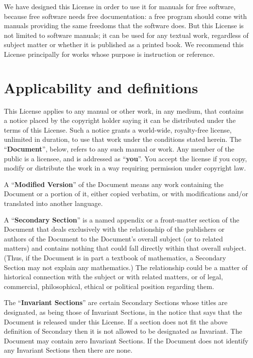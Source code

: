 \documentclass[a4paper,spanish,12pt]{book}
\begin{document}
We have designed this License in order to use it for manuals for free
software, because free software needs free documentation: a free
program should come with manuals providing the same freedoms that the
software does.  But this License is not limited to software manuals;
it can be used for any textual work, regardless of subject matter or
whether it is published as a printed book.  We recommend this License
principally for works whose purpose is instruction or reference.

\section{Applicability and definitions}

This License applies to any manual or other work, in any medium, that
contains a notice placed by the copyright holder saying it can be
distributed under the terms of this License.  Such a notice grants a
world-wide, royalty-free license, unlimited in duration, to use that
work under the conditions stated herein.  The ``\textbf{Document}'', below,
refers to any such manual or work.  Any member of the public is a
licensee, and is addressed as ``\textbf{you}''.  You accept the license if you
copy, modify or distribute the work in a way requiring permission
under copyright law.

A ``\textbf{Modified Version}'' of the Document means any work containing the
Document or a portion of it, either copied verbatim, or with
modifications and/or translated into another language.

A ``\textbf{Secondary Section}'' is a named appendix or a front-matter section of
the Document that deals exclusively with the relationship of the
publishers or authors of the Document to the Document's overall subject
(or to related matters) and contains nothing that could fall directly
within that overall subject.  (Thus, if the Document is in part a
textbook of mathematics, a Secondary Section may not explain any
mathematics.)  The relationship could be a matter of historical
connection with the subject or with related matters, or of legal,
commercial, philosophical, ethical or political position regarding
them.

The ``\textbf{Invariant Sections}'' are certain Secondary Sections whose titles
are designated, as being those of Invariant Sections, in the notice
that says that the Document is released under this License.  If a
section does not fit the above definition of Secondary then it is not
allowed to be designated as Invariant.  The Document may contain zero
Invariant Sections.  If the Document does not identify any Invariant
Sections then there are none.
\end{document}
